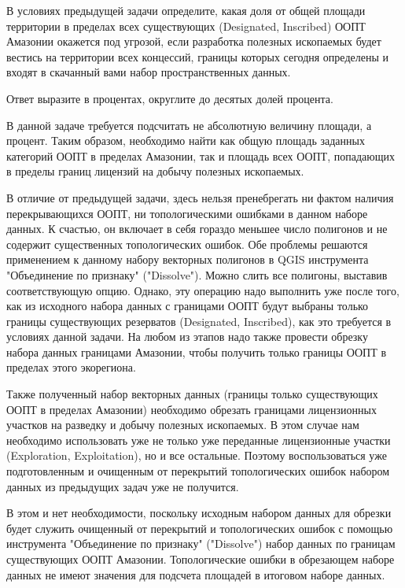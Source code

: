 
В условиях предыдущей задачи определите, какая доля от общей площади территории в пределах всех существующих 
(Designated, Inscribed) ООПТ Амазонии окажется под угрозой, если разработка полезных ископаемых будет 
вестись на территории всех концессий, границы которых сегодня определены и входят в скачанный вами набор 
пространственных данных.

Ответ выразите в процентах, округлите до десятых долей процента.

\explanationSection

В данной задаче требуется подсчитать не абсолютную величину площади, а процент. Таким образом, необходимо найти как общую площадь заданных категорий ООПТ в пределах Амазонии, так и площадь всех ООПТ, попадающих в пределы границ лицензий на добычу полезных ископаемых.

В отличие от предыдущей задачи, здесь нельзя пренебрегать ни фактом наличия перекрывающихся ООПТ, ни топологическими ошибками в данном наборе данных. К счастью, он включает в себя гораздо меньшее число полигонов и не содержит существенных топологических ошибок. Обе проблемы решаются применением к данному набору векторных полигонов в QGIS инструмента "Объединение по признаку" ("Dissolve"). Можно слить все полигоны, выставив соответствующую опцию. Однако, эту операцию надо выполнить уже после того, как из исходного набора данных с границами ООПТ будут выбраны только границы существующих резерватов (Designated, Inscribed), как это требуется в условиях данной задачи. На любом из этапов надо также провести обрезку набора данных границами Амазонии, чтобы получить только границы ООПТ в пределах этого экорегиона.

Также полученный набор векторных данных (границы только существующих ООПТ в пределах Амазонии) необходимо обрезать границами лицензионных участков на разведку и добычу полезных ископаемых. В этом случае нам необходимо использовать уже не только уже переданные лицензионные участки (Exploration, Exploitation), но и все остальные. Поэтому воспользоваться уже подготовленным и очищенным от перекрытий топологических ошибок набором данных из предыдущих задач уже не получится.

В этом и нет необходимости, поскольку исходным набором данных для обрезки будет служить очищенный от перекрытий и топологических ошибок с помощью инструмента "Объединение по признаку" ("Dissolve") набор данных по границам существующих ООПТ Амазонии. Топологические ошибки в обрезающем наборе данных не имеют значения для подсчета площадей в итоговом наборе данных.

